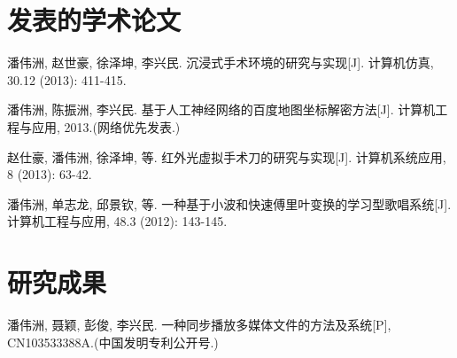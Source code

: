 \begin{resume}

  \section*{发表的学术论文} %

  \begin{enumerate}[{[}1{]}]
  \addtolength{\itemsep}{-.36\baselineskip}%
  \item 潘伟洲, 赵世豪, 徐泽坤, 李兴民. 沉浸式手术环境的研究与实现[J]. 计算机仿真,
  30.12 (2013): 411-415.
  \item 潘伟洲, 陈振洲, 李兴民. 基于人工神经网络的百度地图坐标解密方法[J].
    计算机工程与应用, 2013.(网络优先发表.)
  \item 赵仕豪, 潘伟洲, 徐泽坤, 等. 红外光虚拟手术刀的研究与实现[J]. 计算机系统应用,
    8 (2013): 63-42.
  \item 潘伟洲, 单志龙, 邱景钦, 等. 一种基于小波和快速傅里叶变换的学习型歌唱系统[J].
    计算机工程与应用, 48.3 (2012): 143-145.
  \end{enumerate}

  \section*{研究成果} %
  \begin{enumerate}[{[}1{]}]
  \addtolength{\itemsep}{-.36\baselineskip}%
  \item 潘伟洲, 聂颖, 彭俊, 李兴民. 一种同步播放多媒体文件的方法及系统[P], CN103533388A.(中国发明专利公开号.)
  \end{enumerate}
\end{resume}
